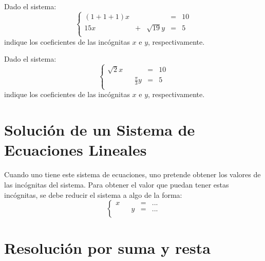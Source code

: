 \documentclass[12pt]{report}
\theoremstyle{largebreak}
\begin{document}
    \begin{excer}
        Dado el sistema:
        \begin{equation*}
            \left\{
                \begin{array}{ccccc}
                    (1+1+1)x &  &  & = & 10 \\
                    15x & + & \sqrt{19}y & = & 5 \\
                \end{array}
            \right.
        \end{equation*}
        indique los coeficientes de las incógnitas $x$ e $y$, respectivamente.
    \end{excer}

    \begin{excer}
        Dado el sistema:
        \begin{equation*}
            \left\{
                \begin{array}{ccccc}
                    \sqrt{2}x &  &  & = & 10 \\
                     &  & \frac{\pi}{3}y & = & 5 \\
                \end{array}
            \right.
        \end{equation*}
        indique los coeficientes de las incógnitas $x$ e $y$, respectivamente.
    \end{excer}

    \section{Solución de un Sistema de Ecuaciones Lineales}
    
    Cuando uno tiene este sistema de ecuaciones, uno pretende obtener los valores de las incógnitas del sistema. Para obtener el valor que puedan tener estas incógnitas, se debe reducir el sistema a algo de la forma:
    \begin{equation}
        \left\{
            \begin{array}{ccccc}
                x &  &  & = & ... \\
                &  & y & = & ... \\
            \end{array}
        \right.
    \end{equation}

    \section{Resolución por suma y resta}
\end{document}
